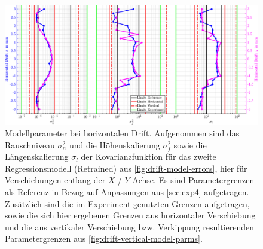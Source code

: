 \clearpage
\begin{landscape}
\begin{figure}[tbph]
	\centering
	\includegraphics[width=\linewidth]{chapters/images/4-EuOExp/Drift-Horizontal-Model-Parms}
	\caption[Modellparameter bei horizontalem Drift]{Modellparameter bei horizontalen Drift. Aufgenommen sind das Rauschniveau $\sigma_n^2$ und die Höhenskalierung $\sigma_f^2$ sowie die Längenskalierung $\sigma_l$ der Kovarianzfunktion für das zweite Regressionsmodell (Retrained) aus \autoref{fig:drift-model-errors}, hier für Verschiebungen entlang der $X$-/ $Y$-Achse. Es sind Parametergrenzen als Referenz in Bezug auf Anpassungen aus \autoref{sec:exp4} aufgetragen. Zusätzlich sind die im Experiment genutzten Grenzen aufgetragen, sowie die sich hier ergebenen Grenzen aus horizontaler Verschiebung und die aus vertikaler Verschiebung bzw. Verkippung resultierenden Parametergrenzen aus \autoref{fig:drift-vertical-model-parms}.}
	\label{fig:drift-horizontal-model-parms}
\end{figure}
\end{landscape}


